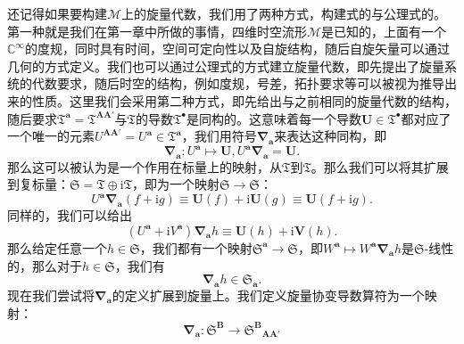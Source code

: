还记得如果要构建$\mathcal{M}$上的旋量代数，我们用了两种方式，构建式的与公理式的。第一种就是我们在第一章中所做的事情，四维时空流形$\mathcal{M}$是已知的，上面有一个$\mathbb{C}^{\infty }$的度规，同时具有时间，空间可定向性以及自旋结构，随后自旋矢量可以通过几何的方式定义。我们也可以通过公理式的方式建立旋量代数，即先提出了旋量系统的代数要求，随后时空的结构，例如度规，号差，拓扑要求等可以被视为推导出来的性质。这里我们会采用第二种方式，即先给出与之前相同的旋量代数的结构，随后要求$\mathfrak{T}^{\boldsymbol{a}} =\mathfrak{T}^{\boldsymbol{AA} '}$与$\mathfrak{T}$的导数$\mathfrak{T}^{\bullet }$是同构的。这意味着每一个导数$\boldsymbol{U} \in \mathfrak{T}^{\bullet }$都对应了一个唯一的元素$U^{\boldsymbol{AA} '} =U^{\boldsymbol{a}} \in \mathfrak{T}^{\boldsymbol{a}}$，我们用符号$\boldsymbol{\nabla }_{\boldsymbol{a}}$来表达这种同构，即
\begin{equation*}
	\boldsymbol{\nabla }_{\boldsymbol{a}} :U^{\boldsymbol{a}} \mapsto \boldsymbol{U} ,U^{\boldsymbol{a}}\boldsymbol{\nabla }_{\boldsymbol{a}} =\boldsymbol{U} .
\end{equation*}
那么这可以被认为是一个作用在标量上的映射，从$\mathfrak{T}$到$\mathfrak{T}$。那么我们可以将其扩展到复标量：$\mathfrak{S} =\mathfrak{T} \oplus \mathrm{i}\mathfrak{T}$，即为一个映射$\mathfrak{S}\rightarrow \mathfrak{S}$：
\begin{equation*}
	U^{\boldsymbol{a}}\boldsymbol{\nabla }_{\boldsymbol{a}}( f+\mathrm{i} g) \equiv \boldsymbol{U}( f) +\mathrm{i}\boldsymbol{U}( g) \equiv \boldsymbol{U}( f+\mathrm{i} g) .
\end{equation*}
同样的，我们可以给出
\begin{equation*}
	(U^{\boldsymbol{a}} +\mathrm{i} V^{\boldsymbol{a}} )\boldsymbol{\nabla }_{\boldsymbol{a}} h\equiv \boldsymbol{U}( h) +\mathrm{i}\boldsymbol{V}( h) .
\end{equation*}
那么给定任意一个$h\in \mathfrak{S}$，我们都有一个映射$\mathfrak{S}^{\boldsymbol{a}}\rightarrow \mathfrak{S}$，即$W^{\boldsymbol{a}} \mapsto W^{\boldsymbol{a}}\boldsymbol{\nabla }_{\boldsymbol{a}} h$是$\mathfrak{S}$-线性的，那么对于$h\in \mathfrak{S}$，我们有
\begin{equation*}
	\boldsymbol{\nabla }_{\boldsymbol{a}} h\in \mathfrak{S}_{\boldsymbol{a}} .
\end{equation*}
现在我们尝试将$\boldsymbol{\nabla }_{\boldsymbol{a}}$的定义扩展到旋量上。我们定义旋量协变导数算符为一个映射：
\begin{equation*}
	\boldsymbol{\nabla }_{\boldsymbol{a}} :\mathfrak{S}^{\boldsymbol{B}}\rightarrow \mathfrak{S}^{\boldsymbol{B}}{}_{\boldsymbol{AA} '}
\end{equation*}
